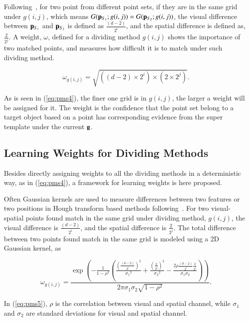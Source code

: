 \documentclass[paper]{ieice}
\begin{document}
Following~\cite{pmk}, for two point from different point sets, if they are in the same grid under $g(i,j)$, which means $G({\bf p}_{S_1};g(i,j))=G({\bf p}_{S_2};g(i,j))$, the visual difference between ${\bf p}_{S_1}$ and ${\bf p}_{S_2}$  is defined as $ \frac {(d-2)}{2^i}$, and the spatial difference is defined as, $ \frac 2 {2^j}$.
A weight, $\omega$, defined for a dividing method $g(i,j)$ shows the importance of two matched points, and measures how difficult it is to match under such dividing method.

\begin{equation}
\label{eq:pms4}
\omega_{g(i,j)}=\sqrt{ ((d-2)\times{2^i})\times(2 \times {2^j})  }.
\end{equation}

As is seen in (\ref{eq:pms4}), the finer one grid is in $g(i,j)$, the larger a weight will be assigned for it. The weight is the confidence that the point set belong to a target object based on a point has corresponding evidence from the super template under the current $\bf g$.

\subsection{Learning Weights for Dividing Methods}
Besides directly assigning weights to all the dividing methods in a deterministic way, as in (\ref{eq:pms4}), a framework for learning weights is here proposed.

Often Gaussian kernels are used to measure differences between two features or two positions in Hough transform based methods following~\cite{lb1}.
For two visual-spatial points found match in the same grid under dividing method, $g(i,j)$,
the visual difference  is  $ \frac {(d-2)}{2^i}$, and the spatial difference is  $ \frac 2 {2^j}$.
The total difference between two points found match in the same grid is modeled using a 2D Gaussian kernel, as

\begin{equation}
\label{eq:pms5}
\omega_{g(i,j)}=\frac {\exp(- \frac 1 {1-\rho^2} ( \frac {(\frac {(d-2)}{2^i})^2} {{\sigma_1}^2}
+ \frac {(\frac {2}{2^j})^2} {{\sigma_2}^2}  - \frac {2 \rho \frac {(d-2)}{2^i}  \frac 2 {2^j}}{\sigma_1 \sigma_2} ))} {2 \pi \sigma_1 \sigma_2 \sqrt{1-\rho^2} } .
\end{equation}


In (\ref{eq:pms5}), $\rho$ is the correlation between visual and spatial channel, while $\sigma_1$ and $\sigma_2$ are standard deviations for visual and spatial channel.
\end{document}
